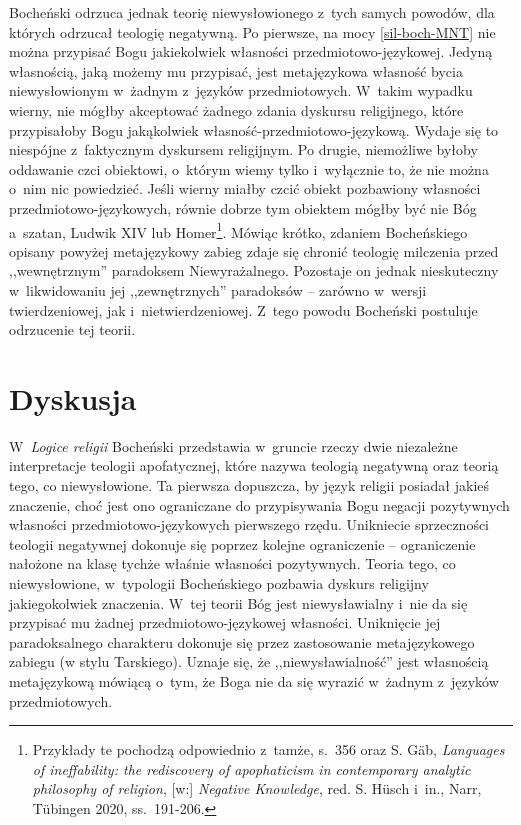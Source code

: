 Bocheński odrzuca jednak teorię niewysłowionego z~tych samych powodów, dla których odrzucał teologię negatywną. Po pierwsze, na mocy \ref{sil-boch-MNT} nie można przypisać Bogu jakiekolwiek własności przedmiotowo-językowej. Jedyną własnością, jaką możemy mu przypisać, jest metajęzykowa własność bycia niewysłowionym w~żadnym z~języków przedmiotowych. W~takim wypadku wierny, nie mógłby akceptować żadnego zdania dyskursu religijnego, które przypisałoby Bogu jakąkolwiek własność-przedmiotowo-językową. Wydaje się to niespójne z~faktycznym dyskursem religijnym. Po drugie, niemożliwe byłoby oddawanie czci obiektowi, o~którym wiemy tylko i~wyłącznie to, że nie można o~nim nic powiedzieć. Jeśli wierny miałby czcić obiekt pozbawiony własności przedmiotowo-językowych, równie dobrze tym obiektem mógłby być nie Bóg a~szatan, Ludwik XIV lub Homer\footnote{Przykłady te pochodzą odpowiednio z~tamże, s.~356 oraz S. Gäb, \textit{Languages of ineffability: the rediscovery of apophaticism in contemporary analytic philosophy of religion}, [w:] \textit{Negative Knowledge}, red. S. Hüsch i~in., Narr, Tübingen 2020, ss.~191-206.}. Mówiąc krótko, zdaniem Bocheńskiego opisany powyżej metajęzykowy zabieg zdaje się chronić teologię milczenia przed ,,wewnętrznym'' paradoksem Niewyrażalnego. Pozostaje on jednak nieskuteczny w~likwidowaniu jej ,,zewnętrznych'' paradoksów -- zarówno w~wersji twierdzeniowej, jak i~nietwierdzeniowej. Z~tego powodu Bocheński postuluje odrzucenie tej teorii.


\section{Dyskusja}\label{sil-boch-dyskusja}

W~\textit{Logice religii} Bocheński przedstawia w~gruncie rzeczy dwie niezależne interpretacje teologii apofatycznej, które nazywa teologią negatywną oraz teorią tego, co niewysłowione. Ta pierwsza dopuszcza, by język religii posiadał jakieś znaczenie, choć jest ono ograniczane do przypisywania Bogu negacji pozytywnych własności przedmiotowo-językowych pierwszego rzędu. Unikniecie sprzeczności teologii negatywnej dokonuje się poprzez kolejne ograniczenie -- ograniczenie nałożone na klasę tychże właśnie własności pozytywnych. Teoria tego, co niewysłowione, w~typologii Bocheńskiego pozbawia dyskurs religijny jakiegokolwiek znaczenia. W~tej teorii Bóg jest niewysławialny i~nie da się przypisać mu żadnej przedmiotowo-językowej własności. Uniknięcie jej paradoksalnego charakteru dokonuje się przez zastosowanie metajęzykowego zabiegu (w stylu Tarskiego). Uznaje się, że ,,niewysławialność'' jest własnością metajęzykową mówiącą o~tym, że Boga nie da się wyrazić w~żadnym z~języków przedmiotowych.

